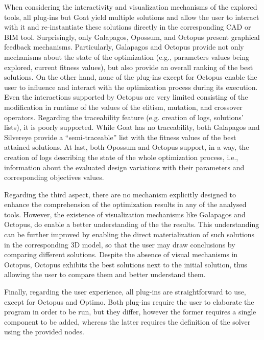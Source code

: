 When considering the interactivity and visualization mechanisms of the explored tools, all plug-ins but Goat yield multiple solutions and allow the user to interact with it and re-instantiate these solutions directly in the corresponding \ac{CAD} or \ac{BIM} tool. Surprisingly, only Galapagos, Opossum, and Octopus present graphical feedback mechanisms. Particularly, Galapagos and Octopus provide not only mechanisms about the state of the optimization (e.g., parameters values being explored, current fitness values), but also provide an overall ranking of the best solutions. On the other hand, none of the plug-ins except for Octopus enable the user to influence and interact with the optimization process during its execution. Even the interactions supported by Octopus are very limited consisting of the modification in runtime of the values of the elitism, mutation, and crossover operators. Regarding the traceability feature (e.g. creation of logs, solutions' lists), it is poorly supported. While Goat has no traceability, both Galapagos and Silvereye provide a ``semi-traceable'' list with the fitness values of the best attained solutions. At last, both Opossum and Octopus support, in a way, the creation of logs describing the state of the whole optimization process, i.e., information about the evaluated design variations with their parameters and corresponding objectives values.

Regarding the third aspect, there are no mechanism explicitly designed to enhance the comprehension of the optimization results in any of the analysed tools. However, the existence of visualization mechanisms like Galapagos and Octopus, do enable a better understanding of the the results. This understanding can be further improved by enabling the direct materialization of such solutions in the corresponding 3D model, so that the user may draw conclusions by comparing different solutions. Despite the absence of visual mechanisms in Octopus, Octopus exhibits the best solutions next to the initial solution, thus allowing the user to compare them and better understand them.

Finally, regarding the user experience, all plug-ins are straightforward to use, except for Octopus and Optimo. Both plug-ins require the user to elaborate the program in order to be run, but they differ, however the former requires a single component to be added, whereas the latter requires the definition of the solver using the provided nodes.


